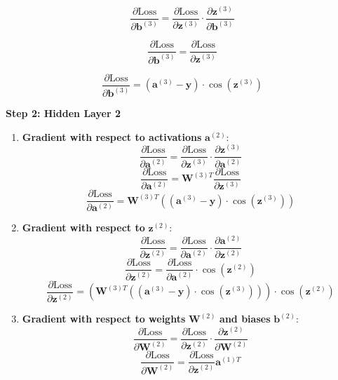 \begin{enumerate}[label=\textbf{\roman*.}]
  \[
  \frac{\partial \text{Loss}}{\partial \mathbf{b}^{(3)}} = \frac{\partial \text{Loss}}{\partial \mathbf{z}^{(3)}} \cdot \frac{\partial \mathbf{z}^{(3)}}{\partial \mathbf{b}^{(3)}}
  \]

  \[
  \frac{\partial \text{Loss}}{\partial \mathbf{b}^{(3)}} = \frac{\partial \text{Loss}}{\partial \mathbf{z}^{(3)}}
  \]

  \begin{equation}
  \frac{\partial \text{Loss}}{\partial \mathbf{b}^{(3)}} = (\mathbf{a}^{(3)} - \mathbf{y}) \cdot \cos(\mathbf{z}^{(3)})
  \end{equation}
  
\end{enumerate}

\textbf{Step 2: Hidden Layer 2}
\begin{enumerate}[label=\textbf{\roman*.}]
  \item \textbf{Gradient with respect to activations} $\mathbf{a}^{(2)}$:
    \[
  \frac{\partial \text{Loss}}{\partial \mathbf{a}^{(2)}} = \frac{\partial \text{Loss}}{\partial \mathbf{z}^{(3)}} \cdot \frac{\partial \mathbf{z}^{(3)}}{\partial \mathbf{a}^{(2)}}
  \]
  \[
  \frac{\partial \text{Loss}}{\partial \mathbf{a}^{(2)}} = \mathbf{W}^{(3)T} \frac{\partial \text{Loss}}{\partial \mathbf{z}^{(3)}}
  \]
  \begin{equation}
  \frac{\partial \text{Loss}}{\partial \mathbf{a}^{(2)}} = \mathbf{W}^{(3)T} \left((\mathbf{a}^{(3)} - \mathbf{y}) \cdot \cos(\mathbf{z}^{(3)})\right)
  \end{equation}
  \item \textbf{Gradient with respect to} $\mathbf{z}^{(2)}$:
    \[
  \frac{\partial \text{Loss}}{\partial \mathbf{z}^{(2)}} = \frac{\partial \text{Loss}}{\partial \mathbf{a}^{(2)}} \cdot \frac{\partial \mathbf{a}^{(2)}}{\partial \mathbf{z}^{(2)}}
  \]
  \[
  \frac{\partial \text{Loss}}{\partial \mathbf{z}^{(2)}} = \frac{\partial \text{Loss}}{\partial \mathbf{a}^{(2)}} \cdot \cos(\mathbf{z}^{(2)})
  \]
  \begin{equation}
  \frac{\partial \text{Loss}}{\partial \mathbf{z}^{(2)}} = \left(\mathbf{W}^{(3)T} \left((\mathbf{a}^{(3)} - \mathbf{y}) \cdot \cos(\mathbf{z}^{(3)})\right)\right) \cdot \cos(\mathbf{z}^{(2)})
  \end{equation}

  \item \textbf{Gradient with respect to weights} $\mathbf{W}^{(2)}$ \textbf{and biases} $\mathbf{b}^{(2)}$:
  \[
  \frac{\partial \text{Loss}}{\partial \mathbf{W}^{(2)}} = \frac{\partial \text{Loss}}{\partial \mathbf{z}^{(2)}} \cdot \frac{\partial \mathbf{z}^{(2)}}{\partial \mathbf{W}^{(2)}}
  \]
  \[
  \frac{\partial \text{Loss}}{\partial \mathbf{W}^{(2)}} = \frac{\partial \text{Loss}}{\partial \mathbf{z}^{(2)}} \mathbf{a}^{(1)T}
  \]


\end{enumerate}
